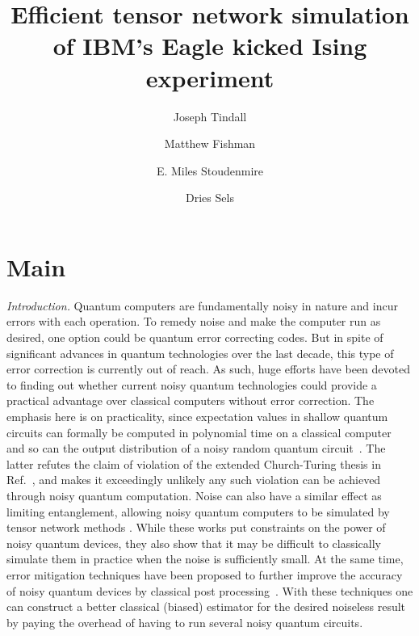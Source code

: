 \documentclass[%
 superscriptaddress,
 amsmath,amssymb,
 prx,
]{revtex4-2}
\begin{document}
\title{Efficient tensor network simulation of IBM's Eagle kicked Ising experiment}


\author{Joseph Tindall}

\author{Matthew Fishman}

\author{E. Miles Stoudenmire}

\author{Dries Sels}



\maketitle


\section*{Main}
\par \emph{Introduction.} Quantum computers are fundamentally noisy in nature and incur errors with each operation. To remedy noise and make the computer run as desired, one option could be quantum error correcting codes. But in spite of significant advances in quantum technologies over the last decade, this type of error correction is currently out of reach. As such, huge efforts have been devoted to finding out whether current noisy quantum technologies could provide a practical advantage over classical computers without error correction. The emphasis here is on practicality, since expectation values in shallow quantum circuits can formally be computed in polynomial time on a classical computer~\cite{bravyi21,wild23} and so can the output distribution of a noisy random quantum circuit~\cite{aharonov23}. The latter refutes the claim of violation of the extended Church-Turing thesis in Ref.~\cite{arute19}, and makes it exceedingly unlikely any such violation can be achieved through noisy quantum computation. 
Noise can also have a similar effect as limiting entanglement, allowing noisy quantum computers to be simulated by
 tensor network methods \cite{Zhou2020, Pan2022, Ayral2023}.
While these works put constraints on the power of noisy quantum devices, they also show that it may be difficult to classically simulate them in practice when the noise is sufficiently small. At the same time, error mitigation techniques have been proposed to further improve the accuracy of noisy quantum devices by classical post processing~\cite{temme17,vandenberg23}. With these techniques one can construct a better classical (biased) estimator for the desired noiseless result by paying the overhead of having to run several noisy quantum circuits.
\end{document}
